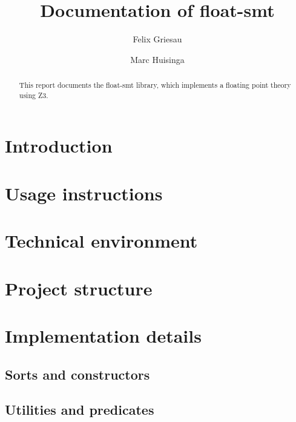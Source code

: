 \documentclass[a4paper,UKenglish,cleveref, autoref, thm-restate]{lipics-v2019}
\title{Documentation of float-smt}
\author{Felix Griesau}{Karlsruhe Institute of Technology, Germany}{TODO}{}{}
\author{Marc Huisinga}{Karlsruhe Institute of Technology, Germany}{mhuisi@protonmail.com}{}{}
\begin{document}
\maketitle

\begin{abstract}
This report documents the float-smt library, which implements a floating point theory using Z3. 
\end{abstract}


\section{Introduction}

\section{Usage instructions}

\section{Technical environment}

\section{Project structure}

\section{Implementation details}

\subsection{Sorts and constructors}

\subsection{Utilities and predicates}
\end{document}
